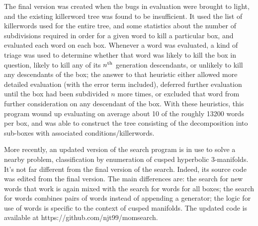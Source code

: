 The final version was created when the bugs in evaluation were
brought to light, and the existing killerword tree was found to be insufficient.
It used the list of killerwords used for the entire tree, and some
statistics about the number of subdivisions required in order for a
given word to kill a particular box, and evaluated each word on each box.
Whenever a word was evaluated,
a kind of triage was used to determine
whether that word was likely to kill the box in question, likely to kill
any of its $n^{\rm th}$ generation descendants, or unlikely to kill any
descendants of the box; the answer to that heuristic either allowed more
detailed evaluation (with the error term included), deferred further
evaluation until the box had been subdivided $n$ more times, or
excluded that word from further consideration on any descendant of
the box.  With these heuristics, this program wound up evaluating on
average about 10 of the roughly 13200 words per box, and was able to
construct the tree consisting of the decomposition into sub-boxes with associated conditions/killerwords.

More recently, an updated version of the search program is in use
to solve a nearby problem, classification by enumeration of cusped hyperbolic
3-manifolds.
It's not far different from the final version of the search.
Indeed, its source code was edited from the final version.
The main differences are:
the search for new words that work is again mixed
with the search for words for all boxes;
the search for words combines pairs of words instead of appending a generator;
the logic for use of words is specific to the context of cusped manifolds.
The updated code is available at https://github.com/njt99/momsearch.
